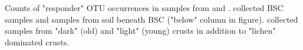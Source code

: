 Counts of "responder" OTU occurrences in samples from \citet{Steven_2013} and \citet{Garcia_Pichel_2013}. \citet{Steven_2013} collected BSC samples and samples from soil beneath BSC ("below" column in figure). \citet{Garcia_Pichel_2013} collected samples from "dark" (old) and "light" (young) crusts in addition to "lichen" dominated crusts.